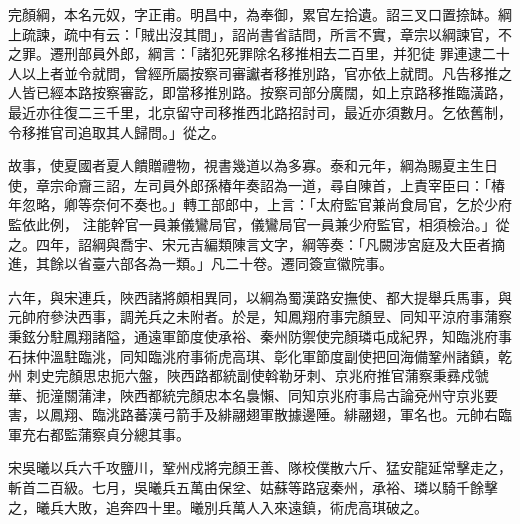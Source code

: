 \begin{pinyinscope}
 完顏綱，本名元奴，字正甫。明昌中，為奉御，累官左拾遺。詔三叉口置捺缽。綱上疏諫，疏中有云：「賊出沒其間」，詔尚書省詰問，所言不實，章宗以綱諫官，不之罪。遷刑部員外郎，綱言：「諸犯死罪除名移推相去二百里，并犯徒
 罪連逮二十人以上者並令就問，曾經所屬按察司審讞者移推別路，官亦依上就問。凡告移推之人皆已經本路按察審訖，即當移推別路。按察司部分廣闊，如上京路移推臨潢路，最近亦往復二三千里，北京留守司移推西北路招討司，最近亦須數月。乞依舊制，令移推官司追取其人歸問。」從之。



 故事，使夏國者夏人饋贈禮物，視書幾道以為多寡。泰和元年，綱為賜夏主生日使，章宗命齎三詔，左司員外郎孫椿年奏詔為一道，尋自陳首，上責宰臣曰：「椿年忽略，卿等奈何不奏也。」轉工部郎中，上言：「太府監官兼尚食局官，乞於少府監依此例，
 注能幹官一員兼儀鸞局官，儀鸞局官一員兼少府監官，相須檢治。」從之。四年，詔綱與喬宇、宋元吉編類陳言文字，綱等奏：「凡闕涉宮庭及大臣者摘進，其餘以省臺六部各為一類。」凡二十卷。遷同簽宣徽院事。



 六年，與宋連兵，陜西諸將頗相異同，以綱為蜀漢路安撫使、都大提舉兵馬事，與元帥府參決西事，調羌兵之未附者。於是，知鳳翔府事完顏昱、同知平涼府事蒲察秉鉉分駐鳳翔諸隘，通遠軍節度使承裕、秦州防禦使完顏璘屯成紀界，知臨洮府事石抹仲溫駐臨洮，同知臨洮府事術虎高琪、彰化軍節度副使把回海備鞏州諸鎮，乾州
 刺史完顏思忠扼六盤，陜西路都統副使斡勒牙刺、京兆府推官蒲察秉彞戍虢華、扼潼關蒲津，陜西都統完顏忠本名裊懶、同知京兆府事烏古論兗州守京兆要害，以鳳翔、臨洮路蕃漢弓箭手及緋翮翅軍散據邊陲。緋翮翅，軍名也。元帥右臨軍充右都監蒲察貞分總其事。



 宋吳曦以兵六千攻鹽川，鞏州戍將完顏王善、隊校僕散六斤、猛安龍延常擊走之，斬首二百級。七月，吳曦兵五萬由保坌、姑蘇等路寇秦州，承裕、璘以騎千餘擊之，曦兵大敗，追奔四十里。曦別兵萬人入來遠鎮，術虎高琪破之。




\end{pinyinscope}
